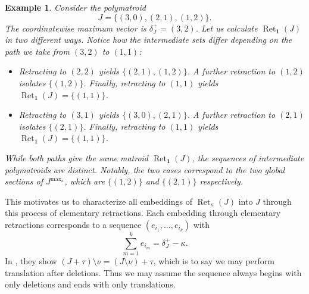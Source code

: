 \documentclass[10pt,a4paper]{amsart}
\newtheorem{example}[theorem]{Example}
\newcommand{\delplus}{\delta_J^+}
\newcommand{\ones}{\textbf{1}}
\DeclareMathOperator{\Ret}{Ret}                %
\newcommand{\RetK}{\Ret_{\kappa}}              %
\newcommand{\Jmax}{J^{\max_{\kappa}}}
\begin{document}
\begin{example}
Consider the polymatroid 
\[
J = \{(3,0), (2,1), (1,2)\}.
\] 
The coordinatewise maximum vector is $\delplus = (3,2)$. Let us calculate $\Ret_{\ones}(J)$ in two different ways. Notice how the intermediate sets differ depending on the path we take from $(3,2)$ to $(1,1)$:

\begin{itemize}
    \item 
    Retracting to $(2,2)$ yields $\{(2,1), (1,2)\}$. A further retraction to $(1,2)$ isolates $\{(1,2)\}$. Finally, retracting to $(1,1)$ yields $\Ret_{\ones}(J) = \{(1,1)\}$.
    
    \item 
    Retracting to $(3,1)$ yields $\{(3,0), (2,1)\}$. A further retraction to $(2,1)$ isolates $\{(2,1)\}$. Finally, retracting to $(1,1)$ yields $\Ret_{\ones}(J) = \{(1,1)\}$.
\end{itemize}

While both paths give the same matroid $\Ret_{\ones}(J)$, the sequences of intermediate polymatroids are distinct. Notably, the two cases correspond to the two global sections of $\Jmax$, which are $\{(1,2)\}$ and $\{(2,1)\}$ respectively.
\end{example}
This motivates us to characterize all embeddings of $\RetK(J)$ into $J$ through this process of elementary retractions. Each embedding through elementary retractions corresponds to a sequence $(e_{i_1},\dots,e_{i_k})$ with \[
\sum_{m=1}^k e_{i_m} = \delplus - \kappa.
\]
In \cite{baker2025representationtheorypolymatroids}, they show $(J + \tau) \setminus \nu = (J \setminus \nu) + \tau$, which is to say we may perform translation after deletions. Thus we may assume the sequence always begins with only deletions and ends with only translations.
\end{document}
